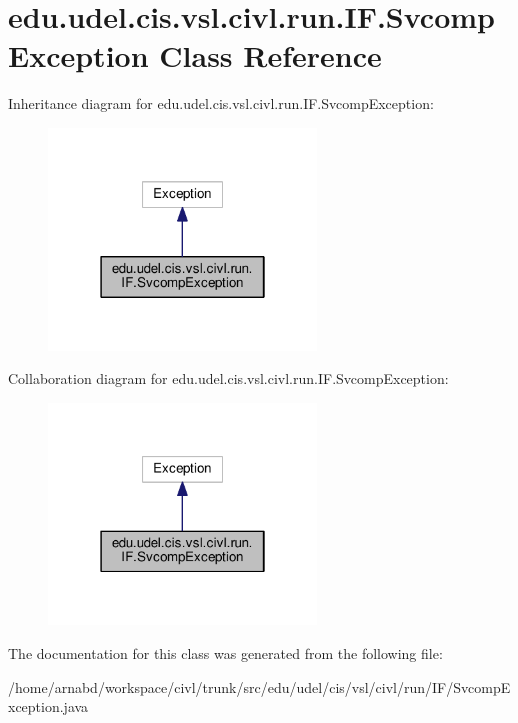 \hypertarget{classedu_1_1udel_1_1cis_1_1vsl_1_1civl_1_1run_1_1IF_1_1SvcompException}{}\section{edu.\+udel.\+cis.\+vsl.\+civl.\+run.\+I\+F.\+Svcomp\+Exception Class Reference}
\label{classedu_1_1udel_1_1cis_1_1vsl_1_1civl_1_1run_1_1IF_1_1SvcompException}


Inheritance diagram for edu.\+udel.\+cis.\+vsl.\+civl.\+run.\+I\+F.\+Svcomp\+Exception\+:
\nopagebreak
\begin{figure}[H]
\begin{center}
\leavevmode
\includegraphics[width=202pt]{classedu_1_1udel_1_1cis_1_1vsl_1_1civl_1_1run_1_1IF_1_1SvcompException__inherit__graph}
\end{center}
\end{figure}


Collaboration diagram for edu.\+udel.\+cis.\+vsl.\+civl.\+run.\+I\+F.\+Svcomp\+Exception\+:
\nopagebreak
\begin{figure}[H]
\begin{center}
\leavevmode
\includegraphics[width=202pt]{classedu_1_1udel_1_1cis_1_1vsl_1_1civl_1_1run_1_1IF_1_1SvcompException__coll__graph}
\end{center}
\end{figure}


The documentation for this class was generated from the following file\+:\begin{DoxyCompactItemize}
\item 
/home/arnabd/workspace/civl/trunk/src/edu/udel/cis/vsl/civl/run/\+I\+F/Svcomp\+Exception.\+java\end{DoxyCompactItemize}
